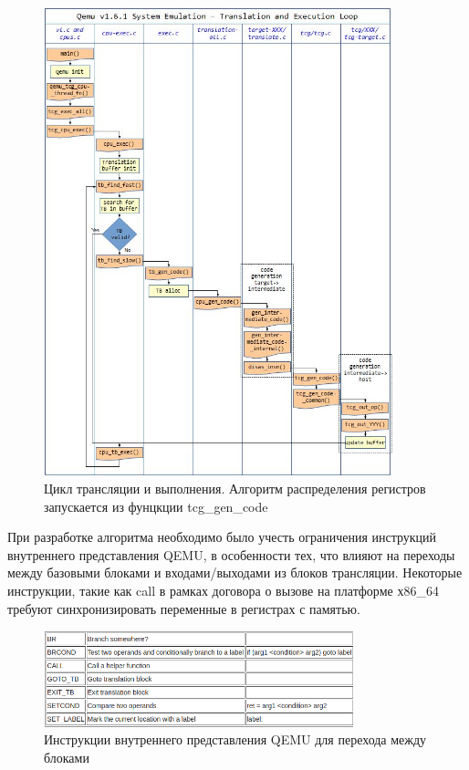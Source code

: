 \begin{figure}[h!]
    \centering
    \includegraphics[width=0.9\textwidth]{qemu_graph.jpg}
    \caption{Цикл трансляции и выполнения. Алгоритм распределения регистров запускается из фунцкции tcg\_gen\_code}
\end{figure}

\newpage


При разработке алгоритма необходимо было учесть ограничения инструкций внутреннего представления QEMU, в особенности тех, что влияют на переходы между базовыми блоками и входами/выходами из блоков трансляции. Некоторые инструкции, такие как call в рамках договора о вызове на платформе х86\_64 требуют синхронизировать переменные в регистрах с памятью.

\begin{figure}[h!]
    \centering
    \includegraphics[width=0.8\textwidth]{table_flow.png}
    \caption{Инструкции внутреннего представления QEMU для перехода между блоками}
\end{figure}

